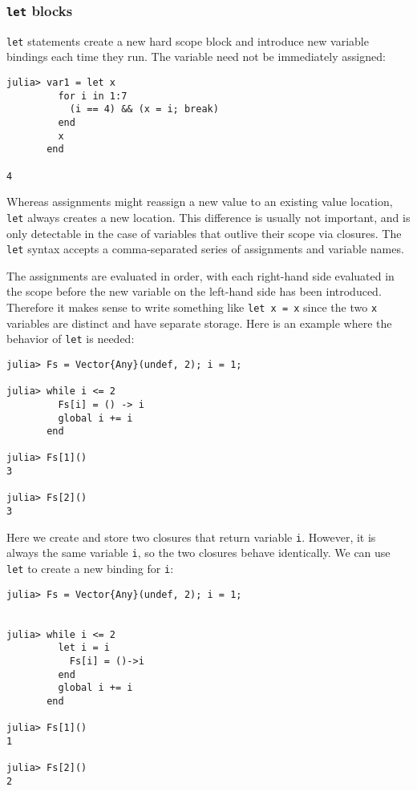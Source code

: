 \documentclass[
]{article}
\begin{document}
\hypertarget{let-blocks}{%
\subsubsection{\texorpdfstring{\texttt{let}
blocks}{let blocks}}\label{let-blocks}}

\texttt{let} statements create a new hard scope block and introduce new
variable bindings each time they run. The variable need not be
immediately assigned:

\begin{verbatim}
julia> var1 = let x
         for i in 1:7
           (i == 4) && (x = i; break)
         end
         x
       end

4
\end{verbatim}

Whereas assignments might reassign a new value to an existing value
location, \texttt{let} always creates a new location. This difference is
usually not important, and is only detectable in the case of variables
that outlive their scope via closures. The \texttt{let} syntax accepts a
comma-separated series of assignments and variable names.

The assignments are evaluated in order, with each right-hand side
evaluated in the scope before the new variable on the left-hand side has
been introduced. Therefore it makes sense to write something like
\texttt{let\ x\ =\ x} since the two \texttt{x} variables are distinct
and have separate storage. Here is an example where the behavior of
\texttt{let} is needed:

\begin{verbatim}
julia> Fs = Vector{Any}(undef, 2); i = 1;

julia> while i <= 2
         Fs[i] = () -> i
         global i += i
       end

julia> Fs[1]()
3

julia> Fs[2]()
3
\end{verbatim}

Here we create and store two closures that return variable \texttt{i}.
However, it is always the same variable \texttt{i}, so the two closures
behave identically. We can use \texttt{let} to create a new binding for
\texttt{i}:

\begin{verbatim}
julia> Fs = Vector{Any}(undef, 2); i = 1;


julia> while i <= 2
         let i = i
           Fs[i] = ()->i
         end
         global i += i
       end

julia> Fs[1]()
1

julia> Fs[2]()
2
\end{verbatim}
\end{document}
